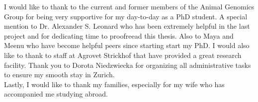 \documentclass[11 pt, a4paper, notitlepage, twoside]{report}
\begin{document}
I would like to thank to the current and former members of the Animal Genomics Group for being very supportive for my day-to-day as a PhD student. 
A special mention to Dr. Alexander S. Leonard who has been extremely helpful in the last project and for dedicating time to proofreead this thesis. 
Also to Maya and Meenu who have become helpful peers since starting start my PhD. 
I would also like to thank to staff at Agrovet Strickhof that have provided a great research facility. 
Thank you to Dorota Niedzwiecka for organizing all administrative tasks to ensure my smooth stay in Zurich.  \\

Lastly, I would like to thank my families, especially for my wife who has accompanied me studying abroad.  

\newpage



\newif\ifincludecv
\includecvtrue %
\ifincludecv
    \newpage
    
\fi
\end{document}
